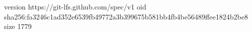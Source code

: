 version https://git-lfs.github.com/spec/v1
oid sha256:fa3246c1ad352e6539fb49772a3b399675b581bb4fb4be56489ffee1824b2be8
size 1779
